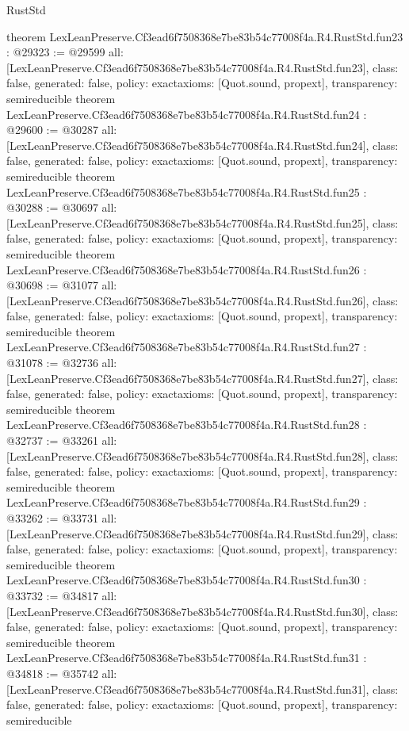 \begin{lexlean}{RustStd}
\begin{coremodule}
{}
theorem LexLeanPreserve.Cf3ead6f7508368e7be83b54c77008f4a.R4.RustStd.fun23 : @29323 := @29599 {
  all: [LexLeanPreserve.Cf3ead6f7508368e7be83b54c77008f4a.R4.RustStd.fun23],
  class: false,
  generated: false,
  policy: exact{axioms: [Quot.sound, propext]},
  transparency: semireducible
}
theorem LexLeanPreserve.Cf3ead6f7508368e7be83b54c77008f4a.R4.RustStd.fun24 : @29600 := @30287 {
  all: [LexLeanPreserve.Cf3ead6f7508368e7be83b54c77008f4a.R4.RustStd.fun24],
  class: false,
  generated: false,
  policy: exact{axioms: [Quot.sound, propext]},
  transparency: semireducible
}
theorem LexLeanPreserve.Cf3ead6f7508368e7be83b54c77008f4a.R4.RustStd.fun25 : @30288 := @30697 {
  all: [LexLeanPreserve.Cf3ead6f7508368e7be83b54c77008f4a.R4.RustStd.fun25],
  class: false,
  generated: false,
  policy: exact{axioms: [Quot.sound, propext]},
  transparency: semireducible
}
theorem LexLeanPreserve.Cf3ead6f7508368e7be83b54c77008f4a.R4.RustStd.fun26 : @30698 := @31077 {
  all: [LexLeanPreserve.Cf3ead6f7508368e7be83b54c77008f4a.R4.RustStd.fun26],
  class: false,
  generated: false,
  policy: exact{axioms: [Quot.sound, propext]},
  transparency: semireducible
}
theorem LexLeanPreserve.Cf3ead6f7508368e7be83b54c77008f4a.R4.RustStd.fun27 : @31078 := @32736 {
  all: [LexLeanPreserve.Cf3ead6f7508368e7be83b54c77008f4a.R4.RustStd.fun27],
  class: false,
  generated: false,
  policy: exact{axioms: [Quot.sound, propext]},
  transparency: semireducible
}
theorem LexLeanPreserve.Cf3ead6f7508368e7be83b54c77008f4a.R4.RustStd.fun28 : @32737 := @33261 {
  all: [LexLeanPreserve.Cf3ead6f7508368e7be83b54c77008f4a.R4.RustStd.fun28],
  class: false,
  generated: false,
  policy: exact{axioms: [Quot.sound, propext]},
  transparency: semireducible
}
theorem LexLeanPreserve.Cf3ead6f7508368e7be83b54c77008f4a.R4.RustStd.fun29 : @33262 := @33731 {
  all: [LexLeanPreserve.Cf3ead6f7508368e7be83b54c77008f4a.R4.RustStd.fun29],
  class: false,
  generated: false,
  policy: exact{axioms: [Quot.sound, propext]},
  transparency: semireducible
}
theorem LexLeanPreserve.Cf3ead6f7508368e7be83b54c77008f4a.R4.RustStd.fun30 : @33732 := @34817 {
  all: [LexLeanPreserve.Cf3ead6f7508368e7be83b54c77008f4a.R4.RustStd.fun30],
  class: false,
  generated: false,
  policy: exact{axioms: [Quot.sound, propext]},
  transparency: semireducible
}
theorem LexLeanPreserve.Cf3ead6f7508368e7be83b54c77008f4a.R4.RustStd.fun31 : @34818 := @35742 {
  all: [LexLeanPreserve.Cf3ead6f7508368e7be83b54c77008f4a.R4.RustStd.fun31],
  class: false,
  generated: false,
  policy: exact{axioms: [Quot.sound, propext]},
  transparency: semireducible
}
\end{coremodule}
\end{lexlean}
